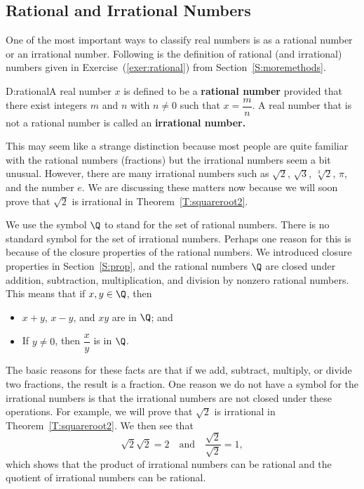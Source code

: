 \subsection*{Rational and Irrational Numbers}
One of the most important ways to classify real numbers is as a rational number or an irrational number.  Following is the definition of rational (and irrational) numbers given in Exercise~(\ref{exer:rational}) from Section~\ref{S:moremethods}.

\begin{defbox}{D:rational}{A real number  $x$ is defined to be a \textbf{rational number}
%
 provided that there exist integers  $m$  and $n$  with  $n \ne 0$ such that $x = \dfrac{m}{n}$.  A real number that is not a rational number is called an \textbf{irrational number.}
%
}
\end{defbox}
This may seem like a strange distinction because most people are quite familiar with the rational numbers (fractions) but the irrational numbers seem a bit unusual.  However, there are many irrational numbers such as $\sqrt{2}$, $\sqrt{3}$, $\sqrt[3]{2}$, $\pi$, and the number $e$.  We are discussing these matters now because we will soon prove that $\sqrt{2}$ is irrational in Theorem~\ref{T:squareroot2}.


We use the symbol $\Q$ to stand for the set of rational numbers.  There is no standard symbol for the set of irrational numbers.  Perhaps one reason for this is because of the closure properties of the rational numbers.  We introduced closure properties in Section~\ref{S:prop}, and the rational numbers $\Q$ are closed under addition, subtraction, multiplication, and division by nonzero rational numbers.  This means that if $x, y \in \Q$, then
\begin{itemize}
  \item $x + y$, $x - y$, and $xy$ are in $\Q$; and
  \item If $y \ne 0$, then $\dfrac{x}{y}$ is in $\Q$.
\end{itemize}
The basic reasons for these facts are that if we add, subtract, multiply, or divide two fractions, the result is a fraction.  One reason we do not have a symbol for the irrational numbers is that the irrational numbers are not closed under these operations.  For example, we will prove that $\sqrt{2}$ is irrational in Theorem~\ref{T:squareroot2}. We then see that
\[
\sqrt{2} \sqrt{2} = 2 \quad \text{and} \quad \frac{\sqrt{2}}{\sqrt{2}} = 1,
\]
which shows that the product of irrational numbers can be rational and the quotient of irrational numbers can be rational.

